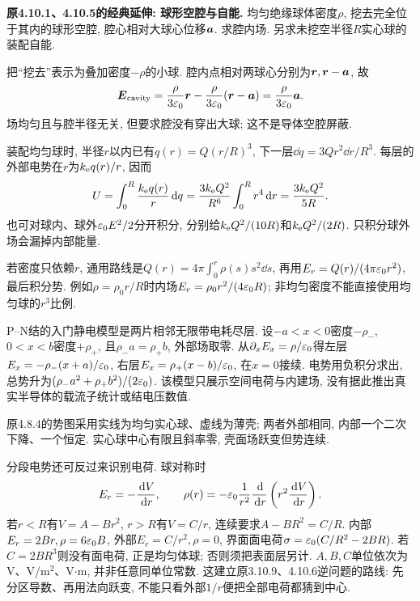 \begin{example}
\textbf{原4.10.1、4.10.5的经典延伸: 球形空腔与自能.} 
均匀绝缘球体密度$\rho$, 挖去完全位于其内的球形空腔, 腔心相对大球心位移$\boldsymbol{a}$. 求腔内场. 另求未挖空半径$R$实心球的装配自能.
\end{example}
\begin{solution}
把“挖去”表示为叠加密度$-\rho$的小球. 腔内点相对两球心分别为$\boldsymbol{r},\boldsymbol{r}-\boldsymbol{a}$, 故
\[\boldsymbol{E}_{\rm cavity}=\frac\rho{3\varepsilon_0}\boldsymbol{r}-\frac\rho{3\varepsilon_0}(\boldsymbol{r}-\boldsymbol{a})=\frac\rho{3\varepsilon_0}\boldsymbol{a}.\]
场均匀且与腔半径无关, 但要求腔没有穿出大球; 这不是导体空腔屏蔽.

装配均匀球时, 半径$r$以内已有$q(r)=Q(r/R)^3$, 下一层$\dd q=3Qr^2\dd r/R^3$. 每层的外部电势在$r$为$k_{\mathrm e} q(r)/r$, 因而
\[U=\int_0^R\frac{k_{\mathrm e} q(r)}r\,\mathrm d q=\frac{3k_{\mathrm e} Q^2}{R^6}\int_0^Rr^4\,\mathrm d r=\frac{3k_{\mathrm e} Q^2}{5R}.\]
也可对球内、球外$\varepsilon_0 E^2/2$分开积分, 分别给$k_{\mathrm e} Q^2/(10R)$和$k_{\mathrm e} Q^2/(2R)$. 只积分球外场会漏掉内部能量.
\end{solution}

若密度只依赖$r$, 通用路线是$Q(r)=4\pi\int_0^r\rho(s)s^2\dd s$, 再用$E_r=Q(r)/(4\pi\varepsilon_0 r^2)$, 最后积分势. 例如$\rho=\rho_0r/R$时内场$E_r=\rho_0r^2/(4\varepsilon_0 R)$; 非均匀密度不能直接使用均匀球的$r^3$比例.

P--N结的入门静电模型是两片相邻无限带电耗尽层. 设$-a<x<0$密度$-\rho_-$, $0<x<b$密度$+\rho_+$, 且$\rho_-a=\rho_+b$, 外部场取零. 从$\partial_xE_x=\rho/\varepsilon_0$得左层$E_x=-\rho_-(x+a)/\varepsilon_0$, 右层$E_x=\rho_+(x-b)/\varepsilon_0$, 在$x=0$接续. 电势用负积分求出, 总势升为$(\rho_-a^2+\rho_+b^2)/(2\varepsilon_0)$. 该模型只展示空间电荷与内建场, 没有据此推出真实半导体的载流子统计或结电压数值.

\begin{center}
\end{center}
原4.8.4的势图采用实线为均匀实心球、虚线为薄壳; 两者外部相同, 内部一个二次下降、一个恒定. 实心球中心有限且斜率零, 壳面场跃变但势连续.

分段电势还可反过来识别电荷. 球对称时
\[E_r=-\frac{\,\mathrm d V}{\,\mathrm d r},\qquad \rho(r)=-\varepsilon_0\frac1{r^2}\frac{\,\mathrm d}{\,\mathrm d r}\left(r^2\frac{\,\mathrm d V}{\,\mathrm d r}\right).\]
若$r<R$有$V=A-Br^2$, $r>R$有$V=C/r$, 连续要求$A-BR^2=C/R$. 内部$E_r=2Br,\rho=6\varepsilon_0 B$, 外部$E_r=C/r^2,\rho=0$, 界面面电荷$\sigma=\varepsilon_0(C/R^2-2BR)$. 若$C=2BR^3$则没有面电荷, 正是均匀体球; 否则须把表面层另计. $A,B,C$单位依次为V、V/m$^2$、V$\cdot$m, 并非任意同单位常数. 这建立原3.10.9、4.10.6逆问题的路线: 先分区导数、再用法向跃变, 不能只看外部$1/r$便把全部电荷都猜到中心.
